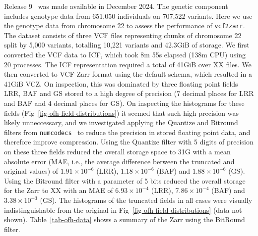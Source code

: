 \documentclass[a4paper,num-refs]{oup-contemporary}
\begin{document}
Release 9~\citep{ofhdatarelease9}
was made available in December 2024. The genetic component includes genotype data
from 651,050 individuals on 707,522 variants. Here we use the genotype data from
chromosome 22 to assess the performance of \texttt{vcf2zarr}. The dataset consists of
three VCF files representing chunks of chromosome 22 split by 5,000 variants, totalling
10,221 variants and 42.3GiB of storage. We first converted the VCF
data to ICF, which took 8m 55s elapsed (138m CPU) using 20 processes.
The ICF representation required a total of 41GiB over XX files.
We then converted to VCF Zarr format using the default schema, which resulted
in a 41GiB VCZ. On inspection, this was dominated by three floating point
fields LRR, BAF and GS stored
to a high degree of precision (7 decimal places for LRR and BAF and 4 decimal
places for GS).
On inspecting the histograms for these fields
(Fig~\ref{fig-ofh-field-distributions}) it seemed that such high precision
was likely unneccessary, and we investigated applying the Quantize
and Bitround filters from \texttt{numcodecs}~\citep{numcodecs}
to reduce the precision in stored floating point data,
and therefore improve compression.
Using the Quantize filter with 5 digits of precision on these three fields reduced the
overall storage space to 31G with a mean absolute error (MAE, i.e., the average
difference between the truncated and original values) of
$1.91\times10^{-6}$ (LRR),
$1.18\times10^{-6}$ (BAF)  and
$1.88\times10^{-6}$ (GS).
Using the Bitround filter with a parameter of 5 bits reduced the overall storage for the Zarr to
XX with an MAE of
$6.93\times10^{-4}$ (LRR),
$7.86\times10^{-4}$ (BAF)  and
$3.38\times10^{-3}$ (GS).
The histograms of the truncated fields in all cases were visually indistinguishable
from the original in Fig~\ref{fig-ofh-field-distributions} (data not shown).
Table~\ref{tab-ofh-data} shows a summary of the Zarr using the BitRound filter.
\end{document}
